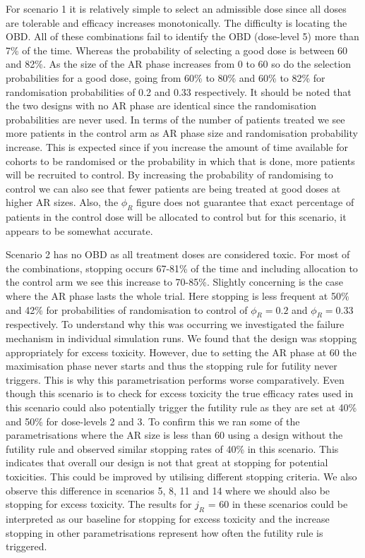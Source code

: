 \newpage

For scenario 1 it is relatively simple to select an admissible dose since all doses are tolerable and efficacy increases monotonically. The difficulty is locating the OBD. All of these combinations fail to identify the OBD (dose-level 5) more than 7\% of the time. Whereas the probability of selecting a good dose is between 60 and 82\%. As the size of the AR phase increases from 0 to 60 so do the selection probabilities for a good dose, going from 60\% to 80\% and 60\% to 82\% for randomisation probabilities of 0.2 and 0.33 respectively. It should be noted that the two designs with no AR phase are identical since the randomisation probabilities are never used. In terms of the number of patients treated we see more patients in the control arm as AR phase size and randomisation probability increase. This is expected since if you increase the amount of time available for cohorts to be randomised or the probability in which that is done, more patients will be recruited to control. By increasing the probability of randomising to control we can also see that fewer patients are being treated at good doses at higher AR sizes. Also, the $\phi_R$ figure does not guarantee that exact percentage of patients in the control dose will be allocated to control but for this scenario, it appears to be somewhat accurate. 

Scenario 2 has no OBD as all treatment doses are considered toxic. For most of the combinations, stopping occurs 67-81\% of the time and including allocation to the control arm we see this increase to 70-85\%. Slightly concerning is the case where the AR phase lasts the whole trial. Here stopping is less frequent at 50\% and 42\% for probabilities of randomisation to control of $\phi_R = 0.2$ and $\phi_R = 0.33$ respectively. To understand why this was occurring we investigated the failure mechanism in individual simulation runs. We found that the design was stopping appropriately for excess toxicity. However, due to setting the AR phase at 60 the maximisation phase never starts and thus the stopping rule for futility never triggers. This is why this parametrisation performs worse comparatively. Even though this scenario is to check for excess toxicity the true efficacy rates used in this scenario could also potentially trigger the futility rule as they are set at 40\% and 50\% for dose-levels 2 and 3. To confirm this we ran some of the parametrisations where the AR size is less than 60 using a design without the futility rule and observed similar stopping rates of 40\% in this scenario. This indicates that overall our design is not that great at stopping for potential toxicities. This could be improved by utilising different stopping criteria. We also observe this difference in scenarios 5, 8, 11 and 14 where we should also be stopping for excess toxicity. The results for $j_R$ = 60 in these scenarios could be interpreted as our baseline for stopping for excess toxicity and the increase stopping in other parametrisations represent how often the futility rule is triggered.      

